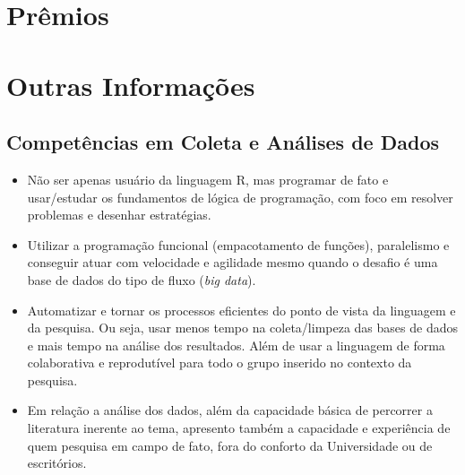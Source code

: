 \documentclass[11pt,a4paper,]{awesome-cv}
\begin{document}
\hypertarget{pruxeamios}{%
\section{Prêmios}\label{pruxeamios}}

\begin{cventries}
    \vspace{-4.0mm}
    \vspace{-4.0mm}
\end{cventries}

\hypertarget{outras-informauxe7uxf5es}{%
\section{Outras Informações}\label{outras-informauxe7uxf5es}}

\hypertarget{competuxeancias-em-coleta-e-anuxe1lises-de-dados}{%
\subsection{\texorpdfstring{\textbf{Competências em Coleta e Análises de
Dados}}{Competências em Coleta e Análises de Dados}}\label{competuxeancias-em-coleta-e-anuxe1lises-de-dados}}

\begin{itemize}
\item
  Não ser apenas usuário da linguagem R, mas programar de fato e
  usar/estudar os fundamentos de lógica de programação, com foco em
  resolver problemas e desenhar estratégias.
\item
  Utilizar a programação funcional (empacotamento de funções),
  paralelismo e conseguir atuar com velocidade e agilidade mesmo quando
  o desafio é uma base de dados do tipo de fluxo (\emph{big data}).
\item
  Automatizar e tornar os processos eficientes do ponto de vista da
  linguagem e da pesquisa. Ou seja, usar menos tempo na coleta/limpeza
  das bases de dados e mais tempo na análise dos resultados. Além de
  usar a linguagem de forma colaborativa e reprodutível para todo o
  grupo inserido no contexto da pesquisa.
\item
  Em relação a análise dos dados, além da capacidade básica de percorrer
  a literatura inerente ao tema, apresento também a capacidade e
  experiência de quem pesquisa em campo de fato, fora do conforto da
  Universidade ou de escritórios.
\end{itemize}
\end{document}
